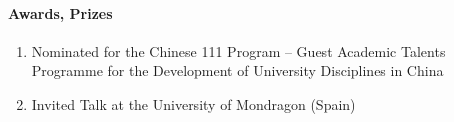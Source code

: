\paragraph{Awards, Prizes}
\begin{enumerate}
\item Nominated for the Chinese 111 Program -- Guest Academic Talents Programme for the Development of University Disciplines in China
\item Invited Talk at the University of Mondragon (Spain)
\end{enumerate}


 
\nocite{ah06_vis_light}
\nocite{bh06_ped_dead_reck}
\nocite{hnona06_iamac}
\nocite{vh06_thru_cap}
\nocite{cvh06_freq_syn}
\nocite{feh06_semi_analytic}
\nocite{fagvh06_sch_CDMA}
\nocite{jhm06_adhoc_tdd_underlay}
\nocite{oha06_tsalloc_insotdd}
\nocite{mhay06_spatialmod}
\nocite{asilomar06}
\nocite{chinacom06}
\nocite{tdd_book}
\nocite{oha07}
 

 